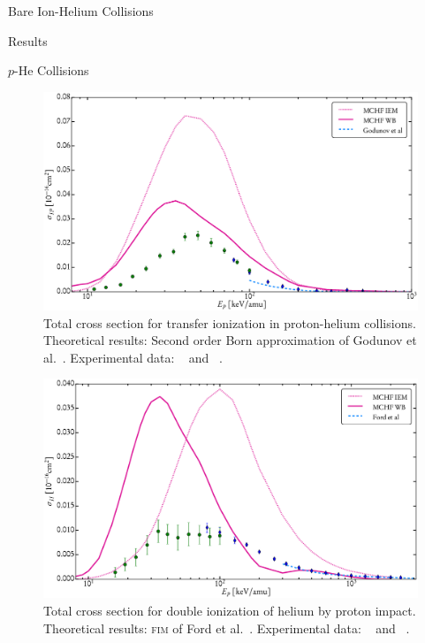 \documentclass[letterpaper, 11 pt]{report}
\begin{document}
\begin{chapter}{Bare Ion-Helium Collisions \label{chap:p-he2p-he}}
\begin{section}{Results \label{sec:phe2p-res}}
\begin{subsection}{\texorpdfstring{$p$}{p}-He Collisions \label{sec:phe-res}}
         \begin{figure}[t]
            \centering
            \includegraphics[width = 0.95 \linewidth]{./images/phe/phe-IP.eps}
            \caption[Total cross section for transfer ionization in proton-helium collisions.]
                    {Total cross section for transfer ionization in proton-helium collisions.
                     Theoretical results: Second order Born approximation of Godunov
                     et al.~\cite{Godunov-06}. Experimental data:
                     {\color{OliveGreen}{$\bullet$}}~\cite{SG89} and
                     {\color{blue}{$\blacklozenge$}}~\cite{SG85}. \label{fig:phe-ip}}
         \end{figure}

         \begin{figure}[t]
            \centering
            \includegraphics[width = 0.95 \linewidth]{./images/phe/phe-II.eps}
            \caption[Total cross section for double ionization of helium by proton impact.]
                    {Total cross section for double ionization of helium by proton impact.
                     Theoretical results: \textsc{fim} of Ford et al.~\cite{FR-94}.
                     Experimental data: {\color{OliveGreen}{$\bullet$}}~\cite{SG89} and
                     {\color{blue}{$\blacklozenge$}}~\cite{SG85}. \label{fig:phe-ii}}
         \end{figure}


\end{subsection}
\end{section}
\end{chapter}
\end{document}

